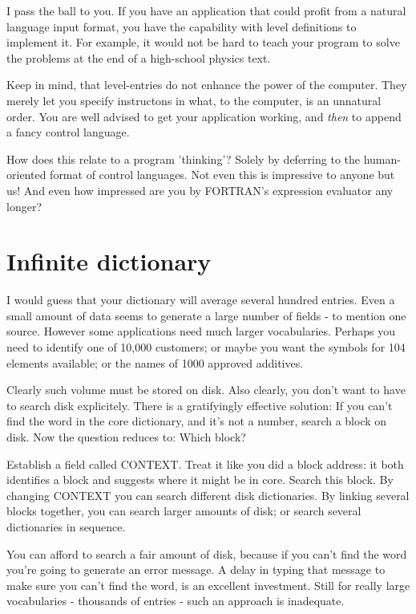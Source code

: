 \documentclass[b5paper, oneside]{book}
\begin{document}
I pass the ball to you. If you have an application that could profit from a natural language input format, you have the capability with level definitions to implement it. For example, it would not be hard to teach your program to solve the problems at the end of a high-school physics text.

Keep in mind, that level-entries do not enhance the power of the computer. They merely let you specify instructons in what, to the computer, is an unnatural order. You are well advised to get your application working, and {\em then} to append a fancy control language.

How does this relate to a program 'thinking'? Solely by deferring to the human-oriented format of control languages. Not even this is impressive to anyone but us! And even how impressed are you by FORTRAN's expression evaluator any longer?

\section{Infinite dictionary}
I would guess that your dictionary will average several hundred entries. Even a small amount of data seems to generate a large number of fields - to mention one source. However some applications need much larger vocabularies. Perhaps you need to identify one of 10,000 customers; or maybe you want the symbols for 104 elements available; or the names of 1000 approved additives.

Clearly such volume must be stored on disk. Also clearly, you don't want to have to search disk explicitely. There is a gratifyingly effective solution: If you can't find the word in the core dictionary, and it's not a number, search a block on disk. Now the question reduces to: Which block?

Establish a field called CONTEXT. Treat it like you did a block address: it both identifies a block and suggests where it might be in core. Search this block. By changing CONTEXT you can search different disk dictionaries. By linking several blocks together, you can search larger amounts of disk; or search several dictionaries in sequence.

You can afford to search a fair amount of disk, because if you can't find the word you're going to generate an error message. A delay in typing that message to make sure you can't find the word, is an excellent investment. Still for really large vocabularies - thousands of entries - such an approach is inadequate.
\end{document}
